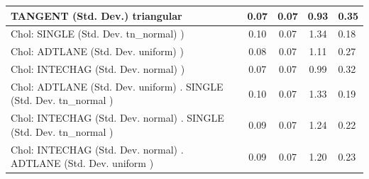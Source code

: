 \begin{table}
\begin{center}
\begin{tabular}{|l|l|c|c|c|l|}
			\hline
			TANGENT (Std. Dev.) triangular &  & 0.07 & 0.07 & 0.93 & 0.35 \\
			\hline
			 Chol: SINGLE (Std. Dev. tn_normal) ) &  & 0.10 & 0.07 & 1.34 & 0.18 \\
			\hline
			 Chol: ADTLANE (Std. Dev. uniform) ) &  & 0.08 & 0.07 & 1.11 & 0.27 \\
			\hline
			 Chol: INTECHAG (Std. Dev. normal) ) &  & 0.07 & 0.07 & 0.99 & 0.32 \\
			\hline
			 Chol: ADTLANE (Std. Dev. uniform) . SINGLE (Std. Dev.   tn_normal ) &  & 0.10 & 0.07 & 1.33 & 0.19 \\
			\hline
			 Chol: INTECHAG (Std. Dev. normal) . SINGLE (Std. Dev.   tn_normal ) &  & 0.09 & 0.07 & 1.24 & 0.22 \\
			\hline
			 Chol: INTECHAG (Std. Dev. normal) . ADTLANE (Std. Dev.   uniform ) &  & 0.09 & 0.07 & 1.20 & 0.23 \\
			\hline
		\end{tabular}
	\end{center}
\end{table}